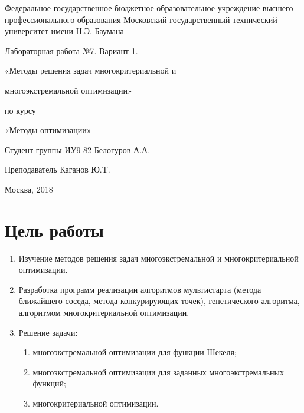 \documentclass[a4paper, 12pt]{article}   	%
\begin{document}
\begin{titlepage}

\thispagestyle{empty}

\begin{center}
Федеральное государственное бюджетное образовательное учреждение высшего профессионального образования Московский государственный технический университет имени Н.Э. Баумана
\end{center}


\vfill

\centerline{\large{Лабораторная работа №7. Вариант 1.}}

\centerline{\large{«Методы решения задач многокритериальной и}} 
\centerline{\large{многоэкстремальной оптимизации»}} 

\centerline{\large{по курсу}}
\centerline{\large{«Методы оптимизации»}}


\vfill

Студент группы ИУ9-82 \hfill Белогуров А.А.

Преподаватель \hfill Каганов Ю.T. 
\vfill

\centerline{Москва, 2018}
\clearpage
\end{titlepage}

\newpage
\setcounter{page}{2}

\tableofcontents

\newpage

\section{Цель работы}

\begin{enumerate}
    \item Изучение методов решения задач многоэкстремальной и многокритериальной оптимизации.

    \item Разработка программ реализации алгоритмов мультистарта (метода ближайшего соседа, метода конкурирующих точек), генетического алгоритма, алгоритмом многокритериальной оптимизации.
    \item Решение задачи:
    \begin{enumerate}
        \item многоэкстремальной оптимизации для функции Шекеля;
        \item многоэкстремальной оптимизации для заданных многоэкстремальных функций;
        \item многокритериальной оптимизации.
    \end{enumerate}

\end{enumerate}
\end{document}
